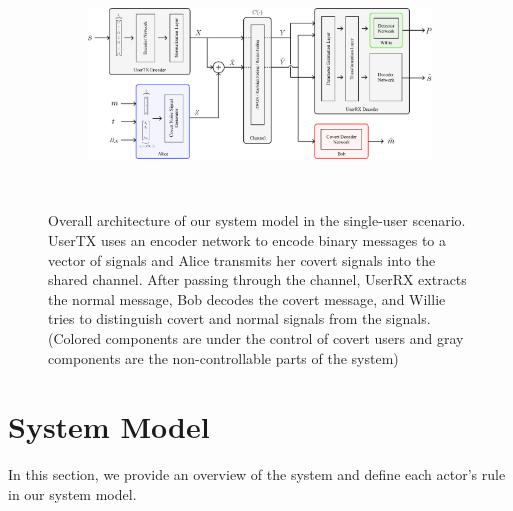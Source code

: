 \begin{figure}[thp]
	\center
	\begin{subfigure}{0.7\textwidth}
		\includegraphics[width=\linewidth]{figs/system_architecture}
	\end{subfigure}
	\\
	\caption{Overall architecture of our system model in the single-user scenario. UserTX uses an encoder network to encode binary messages to a vector of signals and Alice transmits her covert signals into the shared channel. After passing through the channel, UserRX extracts the normal message, Bob decodes the covert message, and Willie tries to distinguish covert and normal signals from the signals. (Colored components are under the control of covert users and gray components are the non-controllable parts of the system)}	
	\label{fig:system_architecture}
\end{figure}


\section{System Model}
\label{s:single-model}
In this section, we provide an overview of the system and define each actor's rule in our system model.

